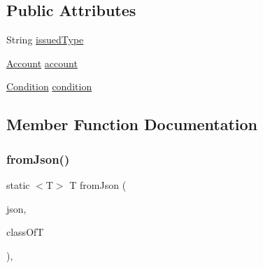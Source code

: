 \subsection*{Public Attributes}
\begin{DoxyCompactItemize}
\item 
String \hyperlink{classcom_1_1toast_1_1android_1_1gamebase_1_1auth_1_1transfer_1_1data_1_1_transfer_account_info_ad35f62c001f018f032fe0a116e26ce19}{issued\+Type}
\item 
\hyperlink{classcom_1_1toast_1_1android_1_1gamebase_1_1auth_1_1transfer_1_1data_1_1_transfer_account_info_1_1_account}{Account} \hyperlink{classcom_1_1toast_1_1android_1_1gamebase_1_1auth_1_1transfer_1_1data_1_1_transfer_account_info_ac8b72545960400e567cb234da5b1e592}{account}
\item 
\hyperlink{classcom_1_1toast_1_1android_1_1gamebase_1_1auth_1_1transfer_1_1data_1_1_transfer_account_info_1_1_condition}{Condition} \hyperlink{classcom_1_1toast_1_1android_1_1gamebase_1_1auth_1_1transfer_1_1data_1_1_transfer_account_info_affaeb8d048ccc2fa3933024e634d3d30}{condition}
\end{DoxyCompactItemize}


\subsection{Member Function Documentation}
\mbox{\label{classcom_1_1toast_1_1android_1_1gamebase_1_1base_1_1_value_object_ae6655c88c20a9a8406dc11b46250ac7b}} 
\subsubsection{\texorpdfstring{from\+Json()}{fromJson()}\hspace{0.1cm}{\footnotesize\ttfamily [1/3]}}
{\footnotesize\ttfamily static $<$T$>$ T from\+Json (\begin{DoxyParamCaption}\item[{@Non\+Null String}]{json,  }\item[{Class$<$ T $>$}]{class\+OfT }\end{DoxyParamCaption})\hspace{0.3cm}{\ttfamily [static]}, {\ttfamily [inherited]}}

